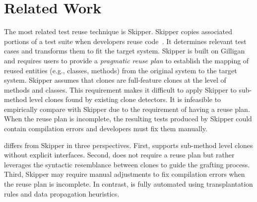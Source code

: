 \section{Related Work} 
The most related test reuse technique is Skipper. Skipper copies associated portions of a test suite when developers reuse code~\cite{2013:spe:makady}. It determines relevant test cases and transforms them to fit the target system. Skipper is built on Gilligan~\cite{holmes2007supporting, 2012:tosem:holmes} and requires users to provide a {\em pragmatic reuse plan} to establish the mapping of reused entities (e.g., classes, methods) from the original system to the target system. Skipper assumes that clones are full-feature clones at the level of methods and classes. This requirement makes it difficult to apply Skipper to sub-method level clones found by existing clone detectors. It is infeasible to empirically compare {\grafter} with Skipper due to the requirement of having a reuse plan. %
When the reuse plan is incomplete, the resulting tests produced by Skipper could contain compilation errors and developers must fix them manually.

{\grafter} differs from Skipper in three perspectives. First, {\grafter} supports sub-method level clones without explicit interfaces. Second, {\grafter} does not require a reuse plan but rather leverages the syntactic resemblance between clones to guide the grafting process. Third, Skipper may require manual adjustments to fix compilation errors when the reuse plan is incomplete. In contrast, {\grafter} is fully automated using transplantation rules and data propagation heuristics.